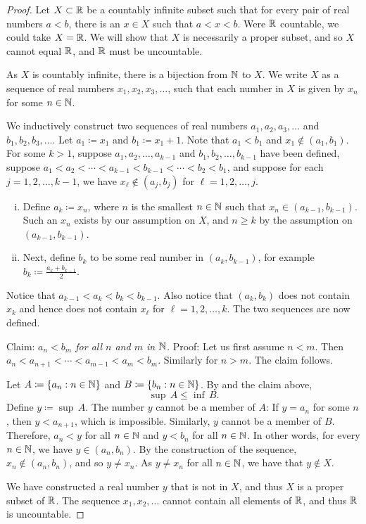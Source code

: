 \begin{proof}
Let $X \subset {\mathbb{R}}$ be a countably infinite
subset such that for every pair of real numbers
$a < b$, there is an $x \in X$ such that $a < x < b$.  Were ${\mathbb{R}}$ countable,
we could take $X = {\mathbb{R}}$.  We will show that $X$ is necessarily
a proper subset, and so $X$ cannot equal ${\mathbb{R}}$, and ${\mathbb{R}}$ must be
uncountable.

As $X$ is countably infinite,
there is a bijection from ${\mathbb{N}}$ to $X$.  We write $X$ as
a sequence of real numbers $x_1, x_2, x_3,\ldots$, such that
each number in $X$
is given by $x_n$ for some $n \in {\mathbb{N}}$.

We inductively
construct two sequences of real numbers $a_1,a_2,a_3,\ldots$ and
$b_1,b_2,b_3,\ldots$.  Let
$a_1 \coloneqq x_1$ and $b_1 \coloneqq x_1+1$.
Note that $a_1 < b_1$ and
$x_1 \notin (a_1,b_1)$.
For some $k > 1$,
suppose $a_1,a_2,\ldots,a_{k-1}$ and $b_1,b_2,\ldots,b_{k-1}$ have been
defined,
suppose
$a_1 < a_2 < \cdots < a_{k-1} < b_{k-1} < \cdots < b_2 < b_1$,
and suppose
for each $j=1,2,\ldots,k-1$,
we have $x_\ell \notin (a_{j},b_{j})$
for $\ell=1,2,\ldots,j$.
\begin{enumerate}[(i)]
\item Define $a_k \coloneqq x_n$, where $n$ is the smallest $n \in {\mathbb{N}}$
such that $x_n \in (a_{k-1},b_{k-1})$.  Such an $x_n$ exists by our
assumption on $X$, and $n \geq k$ by the assumption on $(a_{k-1},b_{k-1})$.
\item Next, define $b_k$ to be some real number in $(a_{k},b_{k-1})$,
for example $b_k \coloneqq \frac{a_k+b_{k-1}}{2}$.
\end{enumerate}
Notice that %
$a_{k-1} < a_k < b_k < b_{k-1}$.
Also notice that $(a_{k},b_{k})$ does not contain $x_k$ and hence
does not contain $x_{\ell}$ for $\ell=1,2,\ldots,k$.
The two sequences are now defined.

Claim: \emph{$a_n < b_m$ for all $n$ and $m$ in ${\mathbb{N}}$.} Proof: Let us first
assume $n < m$.  Then $a_n < a_{n+1} < \cdots < a_{m-1} < a_m < b_m$.
Similarly for $n > m$.  The claim follows.

Let $A \coloneqq \{ a_n : n \in {\mathbb{N}} \}$ and $B \coloneqq \{ b_n : n \in {\mathbb{N}} \}$.
By  and the claim above,
\begin{equation*}
\sup\, A \leq \inf\, B .
\end{equation*}
Define $y \coloneqq \sup\, A$.  The number $y$ cannot be a member of $A$: If $y = a_n$
for some $n$, then $y < a_{n+1}$, which is impossible.
Similarly, $y$ cannot be a member of $B$.  Therefore,
$a_n < y$ for all $n\in {\mathbb{N}}$
and $y < b_n$ for all $n\in {\mathbb{N}}$.
In other words, for every $n \in {\mathbb{N}}$, we have $y \in (a_n,b_n)$.
By the construction of the sequence, $x_n \notin (a_n,b_n)$,
and so $y \neq x_n$.  As $y \neq x_n$ for all $n \in {\mathbb{N}}$, we have that $y
\notin X$.

We have constructed a real number $y$ that is not in $X$, and thus $X$
is a proper subset of ${\mathbb{R}}$.
The sequence $x_1,x_2,\ldots$ cannot contain all elements of ${\mathbb{R}}$,
and thus ${\mathbb{R}}$ is uncountable.
\end{proof}

